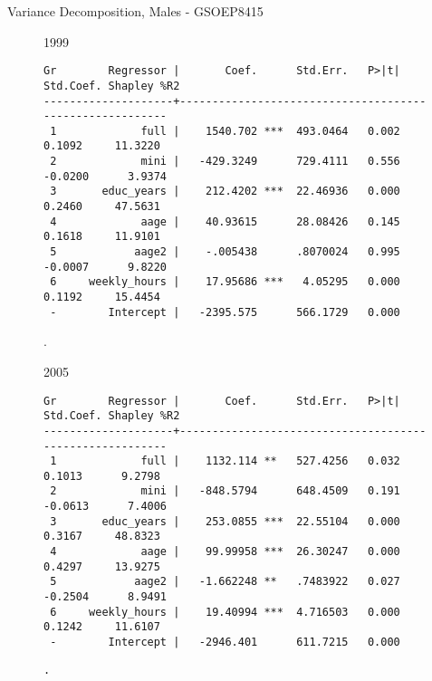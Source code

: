 \documentclass{beamer}
\begin{document}
\begin{frame}[fragile]{Variance Decomposition, Males - GSOEP8415}
\begin{figure}
\centering
\begin{minipage}[b]{0.4\textwidth}{1999}
\begin{Verbatim}[fontsize=\tiny]
Gr        Regressor |       Coef.      Std.Err.   P>|t|  Std.Coef. Shapley %R2
--------------------+---------------------------------------------------------
 1             full |    1540.702 ***  493.0464   0.002     0.1092     11.3220
 2             mini |   -429.3249      729.4111   0.556    -0.0200      3.9374
 3       educ_years |    212.4202 ***  22.46936   0.000     0.2460     47.5631
 4             aage |    40.93615      28.08426   0.145     0.1618     11.9101
 5            aage2 |    -.005438      .8070024   0.995    -0.0007      9.8220
 6     weekly_hours |    17.95686 ***   4.05295   0.000     0.1192     15.4454
 -        Intercept |   -2395.575      566.1729   0.000 
\end{Verbatim}
\end{minipage}
\begin{minipage}{0.4\textwidth}
.
\end{minipage}
\end{figure}
\begin{figure}
\centering
\begin{minipage}[b]{0.4\textwidth}{2005}
\begin{Verbatim}[fontsize=\tiny]
Gr        Regressor |       Coef.      Std.Err.   P>|t|  Std.Coef. Shapley %R2
--------------------+---------------------------------------------------------
 1             full |    1132.114 **   527.4256   0.032     0.1013      9.2798
 2             mini |   -848.5794      648.4509   0.191    -0.0613      7.4006
 3       educ_years |    253.0855 ***  22.55104   0.000     0.3167     48.8323
 4             aage |    99.99958 ***  26.30247   0.000     0.4297     13.9275
 5            aage2 |   -1.662248 **   .7483922   0.027    -0.2504      8.9491
 6     weekly_hours |    19.40994 ***  4.716503   0.000     0.1242     11.6107
 -        Intercept |   -2946.401      611.7215   0.000  
\end{Verbatim}
\end{minipage}
\begin{minipage}[b]{0.4\textwidth}
\begin{Verbatim}[fontsize=\tiny]
.
\end{Verbatim}
\end{minipage}
\end{figure}
\end{frame}
\end{document}
